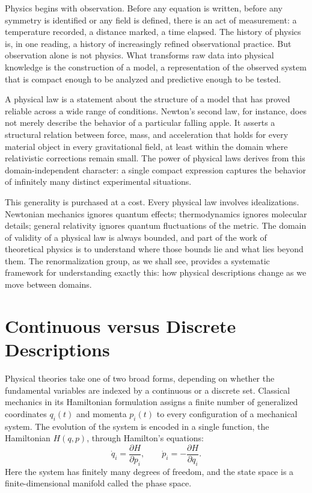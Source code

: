 \documentclass[11pt, twoside, openright]{book}
\theoremstyle{dotted}
\theoremstyle{definition}
\begin{document}
Physics begins with observation. Before any equation is written, before any
symmetry is identified or any field is defined, there is an act of measurement:
a temperature recorded, a distance marked, a time elapsed. The history of physics
is, in one reading, a history of increasingly refined observational practice. But
observation alone is not physics. What transforms raw data into physical knowledge
is the construction of a model, a representation of the observed system that is
compact enough to be analyzed and predictive enough to be tested.

A physical law is a statement about the structure of a model that has proved
reliable across a wide range of conditions. Newton's second law, for instance, does
not merely describe the behavior of a particular falling apple. It asserts a
structural relation between force, mass, and acceleration that holds for every
material object in every gravitational field, at least within the domain where
relativistic corrections remain small. The power of physical laws derives from this
domain-independent character: a single compact expression captures the behavior of
infinitely many distinct experimental situations.

This generality is purchased at a cost. Every physical law involves idealizations.
Newtonian mechanics ignores quantum effects; thermodynamics ignores molecular
details; general relativity ignores quantum fluctuations of the metric. The
domain of validity of a physical law is always bounded, and part of the work of
theoretical physics is to understand where those bounds lie and what lies beyond
them. The renormalization group, as we shall see, provides a systematic framework
for understanding exactly this: how physical descriptions change as we move between
domains.

\section{Continuous versus Discrete Descriptions}

Physical theories take one of two broad forms, depending on whether the fundamental
variables are indexed by a continuous or a discrete set. Classical mechanics in its
Hamiltonian formulation assigns a finite number of generalized coordinates
$q_i(t)$ and momenta $p_i(t)$ to every configuration of a mechanical system. The
evolution of the system is encoded in a single function, the Hamiltonian $H(q,p)$,
through Hamilton's equations:
\begin{equation}
  \dot q_i = \frac{\partial H}{\partial p_i}, \qquad
  \dot p_i = -\frac{\partial H}{\partial q_i}.
  \label{eq:hamilton}
\end{equation}
Here the system has finitely many degrees of freedom, and the state space is a
finite-dimensional manifold called the phase space.
\end{document}

